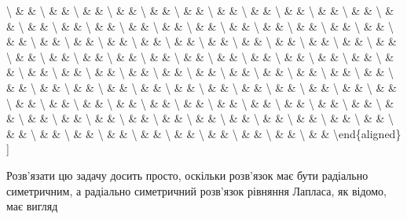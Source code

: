 \documentclass[
]{article}
\begin{document}
\textbackslash{} \& \& \textbackslash{} \& \& \textbackslash{} \& \&
\textbackslash{} \& \& \textbackslash{} \& \& \textbackslash{} \& \&
\textbackslash{} \& \& \textbackslash{} \& \& \textbackslash{} \& \&
\textbackslash{} \& \& \textbackslash{} \& \& \textbackslash{} \& \&
\textbackslash{} \& \& \textbackslash{} \& \& \textbackslash{} \& \&
\textbackslash{} \& \& \textbackslash{} \& \& \textbackslash{} \& \&
\textbackslash{} \& \& \textbackslash{} \& \& \textbackslash{} \& \&
\textbackslash{} \& \& \textbackslash{} \& \& \textbackslash{} \& \&
\textbackslash{} \& \& \textbackslash{} \& \& \textbackslash{} \& \&
\textbackslash{} \& \& \textbackslash{} \& \& \textbackslash{} \& \&
\textbackslash{} \& \& \textbackslash{} \& \& \textbackslash{} \& \&
\textbackslash{} \& \& \textbackslash{} \& \& \textbackslash{} \& \&
\textbackslash{} \& \& \textbackslash{} \& \& \textbackslash{} \& \&
\textbackslash{} \& \& \textbackslash{} \& \& \textbackslash{} \& \&
\textbackslash{} \& \& \textbackslash{} \& \& \textbackslash{} \& \&
\textbackslash{} \& \& \textbackslash{} \& \& \textbackslash{} \& \&
\textbackslash{} \& \& \textbackslash{} \& \& \textbackslash{} \& \&
\textbackslash{} \& \& \textbackslash{} \& \& \textbackslash{} \& \&
\textbackslash{} \& \& \textbackslash{} \& \& \textbackslash{} \& \&
\textbackslash{} \& \& \textbackslash{} \& \& \textbackslash{} \& \&
\textbackslash{} \& \& \textbackslash{} \& \& \textbackslash{} \& \&
\textbackslash{} \& \& \textbackslash{} \& \& \textbackslash{} \& \&
\textbackslash{} \& \& \textbackslash{} \& \& \textbackslash{} \& \&
\textbackslash{} \& \& \textbackslash{} \& \& \textbackslash{} \& \&
\textbackslash{} \& \& \textbackslash{} \& \& \textbackslash{} \& \&
\textbackslash{} \& \& \textbackslash{} \& \& \textbackslash{} \& \&
\textbackslash{} \& \& \textbackslash{} \& \& \textbackslash{} \& \&
\textbackslash{} \& \& \textbackslash{} \& \& \textbackslash{} \& \&
\textbackslash{} \& \& \textbackslash{} \& \& \textbackslash{} \& \&
\textbackslash{} \& \& \textbackslash{} \& \& \textbackslash{} \& \&
\textbackslash{} \& \& \textbackslash{} \& \& \textbackslash{} \& \&
\textbackslash{} \& \& \textbackslash{} \& \& \textbackslash{} \& \&
\textbackslash{} \& \& \textbackslash{} \& \& \textbackslash{} \& \&
\textbackslash{} \& \& \textbackslash{} \& \& \textbackslash{} \& \&
\textbackslash{} \& \& \textbackslash end\{aligned\} {]}

Розв'язати цю задачу досить просто, оскільки розв'язок має бути
радіально симетричним, а радіально симетричний розв'язок рівняння
Лапласа, як відомо, має вигляд
\end{document}
